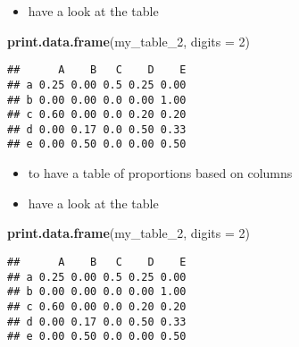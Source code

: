 \documentclass[
]{article}
\newenvironment{Shaded}{\begin{snugshade}}{\end{snugshade}}
\newcommand{\DataTypeTok}[1]{\textcolor[rgb]{0.13,0.29,0.53}{#1}}
\newcommand{\DecValTok}[1]{\textcolor[rgb]{0.00,0.00,0.81}{#1}}
\newcommand{\KeywordTok}[1]{\textcolor[rgb]{0.13,0.29,0.53}{\textbf{#1}}}
\newcommand{\NormalTok}[1]{#1}
\newcommand{\OperatorTok}[1]{\textcolor[rgb]{0.81,0.36,0.00}{\textbf{#1}}}
\newcommand{\StringTok}[1]{\textcolor[rgb]{0.31,0.60,0.02}{#1}}
\providecommand{\tightlist}{%
  \setlength{\itemsep}{0pt}\setlength{\parskip}{0pt}}
\begin{document}
\begin{itemize}
\tightlist
\item
  have a look at the table
\end{itemize}

\begin{Shaded}
\begin{Highlighting}[]
\KeywordTok{print.data.frame}\NormalTok{(my_table_}\DecValTok{2}\NormalTok{, }\DataTypeTok{digits =} \DecValTok{2}\NormalTok{)}
\end{Highlighting}
\end{Shaded}

\begin{verbatim}
##      A    B   C    D    E
## a 0.25 0.00 0.5 0.25 0.00
## b 0.00 0.00 0.0 0.00 1.00
## c 0.60 0.00 0.0 0.20 0.20
## d 0.00 0.17 0.0 0.50 0.33
## e 0.00 0.50 0.0 0.00 0.50
\end{verbatim}

\begin{itemize}
\tightlist
\item
  to have a table of proportions based on columns
\end{itemize}

\begin{Shaded}
\end{Shaded}

\begin{itemize}
\tightlist
\item
  have a look at the table
\end{itemize}

\begin{Shaded}
\begin{Highlighting}[]
\KeywordTok{print.data.frame}\NormalTok{(my_table_}\DecValTok{2}\NormalTok{, }\DataTypeTok{digits =} \DecValTok{2}\NormalTok{)}
\end{Highlighting}
\end{Shaded}

\begin{verbatim}
##      A    B   C    D    E
## a 0.25 0.00 0.5 0.25 0.00
## b 0.00 0.00 0.0 0.00 1.00
## c 0.60 0.00 0.0 0.20 0.20
## d 0.00 0.17 0.0 0.50 0.33
## e 0.00 0.50 0.0 0.00 0.50
\end{verbatim}
\end{document}
